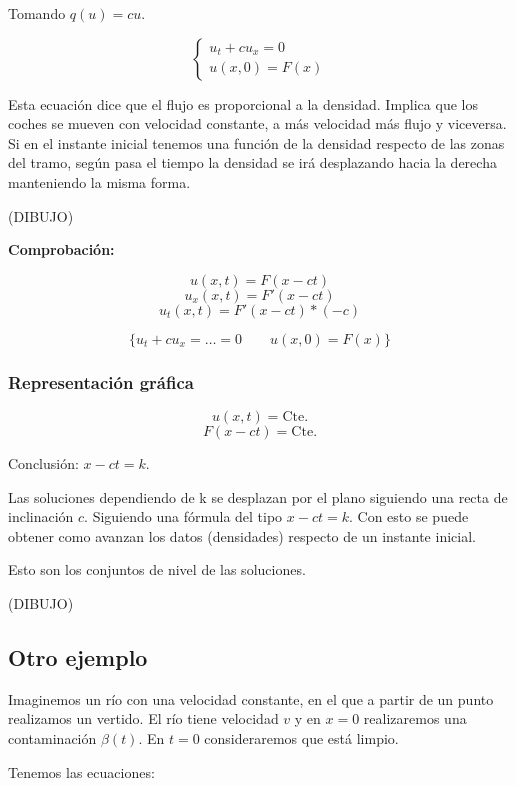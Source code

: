 		Tomando $q(u) = cu$.

		\begin{equation*}
		\left\{
		\begin{array}{l}
		u_t + cu_x = 0 \\
		u(x,0) = F(x)
		\end{array}
		\right.
		\end{equation*}


		Esta ecuación dice que el flujo es proporcional a la densidad. Implica que los coches se mueven con velocidad constante, a más velocidad más flujo y viceversa. Si en el instante inicial tenemos una función de la densidad respecto de las zonas del tramo, según pasa el tiempo la densidad se irá desplazando hacia la derecha manteniendo la misma forma.

		(DIBUJO)

		\textbf{Comprobación:}

		$$ u(x,t) = F(x-ct) $$
		$$ u_x(x,t) = F'(x-ct)$$
		$$u_t(x,t) = F'(x-ct)*(-c)$$

		$$ \{ u_t + cu_x = … = 0 \quad\quad u(x,0) = F(x) \} $$

		\subsubsection{Representación gráfica}


			$$u(x,t) = \text{Cte.}$$
			$$F(x - ct) = \text{Cte.}$$

			Conclusión: $x-ct = k$.


			Las soluciones dependiendo de k se desplazan por el plano siguiendo una recta de inclinación $c$. Siguiendo una fórmula del tipo $x-ct = k$. Con esto se puede obtener como avanzan los datos (densidades) respecto de un instante inicial.

			Esto son los conjuntos de nivel de las soluciones.

			(DIBUJO)



	\subsection{Otro ejemplo}

		Imaginemos un río con una velocidad constante, en el que a partir de un punto realizamos un vertido. El río tiene velocidad $v$ y en $x=0$ realizaremos una contaminación $\beta(t)$. En $t=0$ consideraremos que está limpio.

		Tenemos las ecuaciones:


